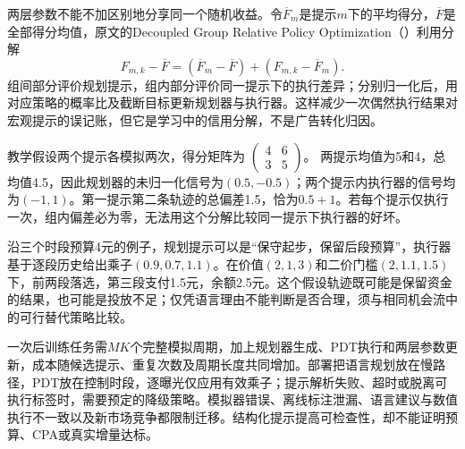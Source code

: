 两层参数不能不加区别地分享同一个随机收益。令$\overline F_m$是提示$m$下的平均得分，$\overline F$是全部得分均值，原文的Decoupled Group Relative Policy Optimization（）利用分解
\begin{equation}
  F_{m,k}-\overline F
    =(\overline F_m-\overline F)
     +(F_{m,k}-\overline F_m).
  \label{eq:rs-advertising-r1-credit}
\end{equation}
组间部分评价规划提示，组内部分评价同一提示下的执行差异；分别归一化后，用对应策略的概率比及截断目标更新规划器与执行器。这样减少一次偶然执行结果对宏观提示的误记账，但它是学习中的信用分解，不是广告转化归因。

教学假设两个提示各模拟两次，得分矩阵为
$\left(\begin{smallmatrix}4&6\\3&5\end{smallmatrix}\right)$。
两提示均值为5和4，总均值4.5，因此规划器的未归一化信号为$(0.5,-0.5)$；两个提示内执行器的信号均为$(-1,1)$。第一提示第二条轨迹的总偏差1.5，恰为$0.5+1$。若每个提示仅执行一次，组内偏差必为零，无法用这个分解比较同一提示下执行器的好坏。

沿三个时段预算4元的例子，规划提示可以是“保守起步，保留后段预算”，执行器基于逐段历史给出乘子$(0.9,0.7,1.1)$。在价值$(2,1,3)$和二价门槛$(2,1.1,1.5)$下，前两段落选，第三段支付1.5元，余额2.5元。这个假设轨迹既可能是保留资金的结果，也可能是投放不足；仅凭语言理由不能判断是否合理，须与相同机会流中的可行替代策略比较。

一次后训练任务需$MK$个完整模拟周期，加上规划器生成、PDT执行和两层参数更新，成本随候选提示、重复次数及周期长度共同增加。部署把语言规划放在慢路径，PDT放在控制时段，逐曝光仅应用有效乘子；提示解析失败、超时或脱离可执行标签时，需要预定的降级策略。模拟器错误、离线标注泄漏、语言建议与数值执行不一致以及新市场竞争都限制迁移。结构化提示提高可检查性，却不能证明预算、CPA或真实增量达标。

